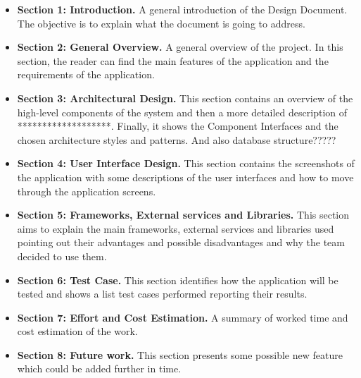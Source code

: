 		\begin{itemize}
			\item \textbf{Section 1: Introduction.} A general introduction of the Design Document. The objective is to explain what the document is going to address.

			\item \textbf {Section 2: General Overview.} A general overview of the project. In this section, the reader can find the main features of the application and
			the requirements of the application.

			\item \textbf{Section 3: Architectural Design.} This section contains an overview of the high-level components of the system and then a more detailed 
			description of *******************. Finally, it shows the Component Interfaces and the chosen architecture styles and patterns. And also database structure?????
			
			\item \textbf{Section 4: User Interface Design.} This section contains the screenshots of the application with some descriptions of the user interfaces 
			and how to move through the application screens.
			
			\item \textbf{Section 5: Frameworks, External services and Libraries.} This section aims to explain the main frameworks, external services and libraries used 
			pointing out their advantages and possible disadvantages and why the team decided to use them.
			
			\item \textbf{Section 6: Test Case.} This section identifies how the application will be tested and shows a list test cases performed reporting their results.
			
			\item \textbf{Section 7: Effort and Cost Estimation.} A summary of worked time and cost estimation of the work.
			
			\item \textbf{Section 8: Future work.} This section presents some possible new feature which could be added further in time.
		\end{itemize}